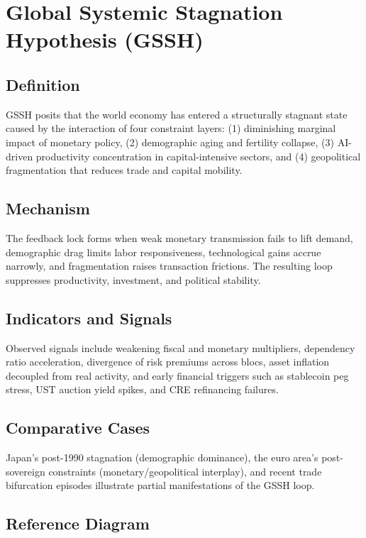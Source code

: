 \section{Global Systemic Stagnation Hypothesis (GSSH)}
\subsection{Definition}
GSSH posits that the world economy has entered a structurally stagnant state caused by the interaction of four constraint layers: (1) diminishing marginal impact of monetary policy, (2) demographic aging and fertility collapse, (3) AI-driven productivity concentration in capital-intensive sectors, and (4) geopolitical fragmentation that reduces trade and capital mobility.

\subsection{Mechanism}
The feedback lock forms when weak monetary transmission fails to lift demand, demographic drag limits labor responsiveness, technological gains accrue narrowly, and fragmentation raises transaction frictions. The resulting loop suppresses productivity, investment, and political stability.

\subsection{Indicators and Signals}
Observed signals include weakening fiscal and monetary multipliers, dependency ratio acceleration, divergence of risk premiums across blocs, asset inflation decoupled from real activity, and early financial triggers such as stablecoin peg stress, UST auction yield spikes, and CRE refinancing failures.

\subsection{Comparative Cases}
Japan's post-1990 stagnation (demographic dominance), the euro area's post-sovereign constraints (monetary/geopolitical interplay), and recent trade bifurcation episodes illustrate partial manifestations of the GSSH loop.

\subsection{Reference Diagram}
